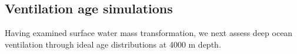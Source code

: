 \documentclass[pdflatex,sn-nature]{sn-jnl}
\begin{document}
\subsection{Ventilation age simulations}









Having examined surface water mass transformation, we next assess deep ocean ventilation through ideal age distributions at 4000 m depth.
\end{document}
